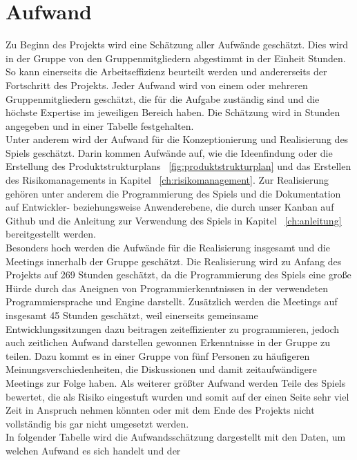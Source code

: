 \chapter{Aufwand}\label{ch:aufwand}
Zu Beginn des Projekts wird eine Schätzung aller Aufwände geschätzt. 
Dies wird in der Gruppe von den Gruppenmitgliedern abgestimmt in der Einheit Stunden.
So kann einerseits die Arbeitseffizienz beurteilt werden und andererseits der Fortschritt des Projekts.
Jeder Aufwand wird von einem oder mehreren Gruppenmitgliedern geschätzt, die für die Aufgabe zuständig sind und 
die höchste Expertise im jeweiligen Bereich haben. 
Die Schätzung wird in Stunden angegeben und in einer Tabelle festgehalten.\\
\newline
Unter anderem wird der Aufwand für die Konzeptionierung und Realisierung des Spiels geschätzt.
Darin kommen Aufwände auf, wie die Ideenfindung oder die Erstellung des Produktstrukturplans 
~\ref{fig:produktstrukturplan} und das Erstellen des Risikomanagements in Kapitel ~\ref{ch:risikomanagement}.
Zur Realisierung gehören unter anderem die Programmierung des Spiels und die Dokumentation auf Entwickler-
beziehungsweise Anwenderebene, die durch unser Kanban auf Github und die Anleitung zur Verwendung des Spiels in Kapitel
~\ref{ch:anleitung} bereitgestellt werden.\\
\newline
Besonders hoch werden die Aufwände für die Realisierung insgesamt und die Meetings innerhalb der Gruppe geschätzt.
Die Realisierung wird zu Anfang des Projekts auf 269 Stunden geschätzt, da die Programmierung des Spiels eine große Hürde
durch das Aneignen von Programmierkenntnissen in der verwendeten Programmiersprache und Engine darstellt.
Zusätzlich werden die Meetings auf insgesamt 45 Stunden geschätzt, weil einerseits gemeinsame Entwicklungssitzungen dazu
beitragen zeiteffizienter zu programmieren, jedoch auch zeitlichen Aufwand darstellen gewonnen Erkenntnisse in der
Gruppe zu teilen.
Dazu kommt es in einer Gruppe von fünf Personen zu häufigeren Meinungsverschiedenheiten, die Diskussionen und damit
zeitaufwändigere Meetings zur Folge haben.
Als weiterer größter Aufwand werden Teile des Spiels bewertet, die als Risiko eingestuft wurden und somit auf der einen 
Seite sehr viel Zeit in Anspruch nehmen könnten oder mit dem Ende des Projekts nicht vollständig bis gar nicht umgesetzt
werden. \\
\newline
In folgender Tabelle wird die Aufwandsschätzung dargestellt mit den Daten, um welchen Aufwand es sich handelt und der
